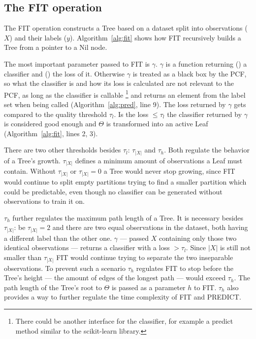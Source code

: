 \subsection{The FIT operation}
\label{subsec:fit}

The FIT operation constructs a Tree based on a dataset
split into observations ($X$) and their labels ($y$).
Algorithm~\ref{alg:fit} shows how FIT recursively builds a
Tree from a pointer to a Nil node.

The most important parameter passed to FIT is $\gamma$.
$\gamma$ is a function returning () a
classifier and () the loss of it. Otherwise
$\gamma$ is treated as a black box by the PCF, so what the
classifier is and how its loss is calculated are not
relevant to the PCF, as long as the classifier is callable%
\footnote{There could be another interface for the
  classifier, for example a predict method similar to the
  scikit-learn library.\cite{sklearn_api}}
and returns an element from the label set when being
called (Algorithm~\ref{alg:pred}, line 9). The loss
returned by $\gamma$ gets compared to the quality threshold
$\tau_l$. Is the loss $\leq \tau_l$ the classifier returned
by $\gamma$ is considered good enough and $\Theta$ is
transformed into an active Leaf (Algorithm~\ref{alg:fit},
lines 2, 3).

There are two other thresholds besides $\tau_l$:
$\tau_{|X|}$ and $\tau_h$. Both regulate the behavior of a
Tree's growth. $\tau_{|X|}$ defines a minimum amount of
observations a Leaf must contain. Without $\tau_{|X|}$ or
$\tau_{|X|} = 0$ a Tree would never stop growing, since FIT
would continue to split empty partitions trying to find a
smaller partition which could be predictable, even though
no classifier can be generated without observations to
train it on.

$\tau_h$ further regulates the maximum path length of a
Tree. It is necessary besides $\tau_{|X|}$: be
$\tau_{|X|} = 2$ and there are two equal observations in
the dataset, both having a different label than the other
one. $\gamma$ --- passed $X$ containing only those two
identical observations --- returns a classifier with a
loss $> \tau_l$. Since $|X|$ is still not smaller than
$\tau_{|X|}$ FIT would continue trying to separate the two
inseparable observations. To prevent such a scenario
$\tau_h$ regulates FIT to stop before the Tree's height
--- the amount of edges of the longest path --- would
exceed $\tau_h$. The path length of the Tree's root to
$\Theta$ is passed as a parameter $h$ to FIT. $\tau_h$ also
provides a way to further regulate the time complexity of
FIT and PREDICT.

